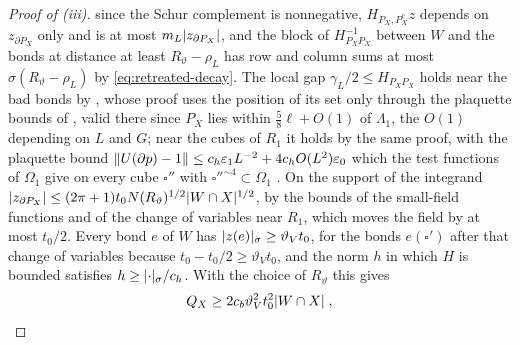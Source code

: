 \documentclass[11pt]{preprint}
\DeclarePairedDelimiter{\abs}{\lvert}{\rvert}
\DeclarePairedDelimiter{\norm}{\lVert}{\rVert}
\numberwithin{equation}{section}
\theoremstyle{definition}
\theoremstyle{remark}
\theoremstyle{plain}
\begin{document}
\begin{proof}[Proof of (iii)]
since the Schur complement is nonnegative, $H_{P_X, P_X^c}z$ depends on $z_{\partial P_X}$ only and is at most $m_L\abs{z_{\partial P_X}}$, and the block of $H_{P_XP_X}^{-1}$ between $W$ and the bonds at distance at least $R_\vartheta - \rho_L$ has row and column sums at most $\sigma(R_\vartheta - \rho_L)$ by \eqref{eq:retreated-decay}. The local gap $\gamma_L/2 \leq H_{P_XP_X}$ holds near the bad bonds by \cite[Lemma~3.4]{WilsonFirstStep}, whose proof uses the position of its set only through the plaquette bounds of \cite[Lemma~B.4]{WilsonFirstStep}, valid there since $P_X$ lies within $\frac58\ell + O(1)$ of $\Lambda_1$, the $O(1)$ depending on $L$ and $G$; near the cubes of $R_1$ it holds by the same proof, with the plaquette bound $\norm{U(\partial p) - 1} \leq c_h\varepsilon_1L^{-2} + 4c_hO(L^2)\varepsilon_0$ which the test functions of $\Omega_1$ give on every cube $\square''$ with $\square''^{\sim4} \subset \Omega_1$ \cite[(1.8), p.~247; (1.11), p.~248]{BalabanCRE}. On the support of the integrand $\abs{z_{\partial P_X}} \leq (2\pi + 1)t_0N(R_\vartheta)^{1/2}\abs{W \cap X}^{1/2}$, by the bounds of the small-field functions and of the change of variables near $R_1$, which moves the field by at most $t_0/2$. Every bond $e$ of $W$ has $\abs{z(e)}_\sigma \geq \vartheta_Vt_0$, for the bonds $e(\square')$ after that change of variables because $t_0 - t_0/2 \geq \vartheta_Vt_0$, and the norm $h$ in which $H$ is bounded satisfies $h \geq \abs{\cdot}_\sigma/c_h$. With the choice of $R_\vartheta$ this gives
\[
    Q_X \geq 2c_b\vartheta_V^2t_0^2\abs{W \cap X}\;,
\]

\end{proof}
\end{document}
